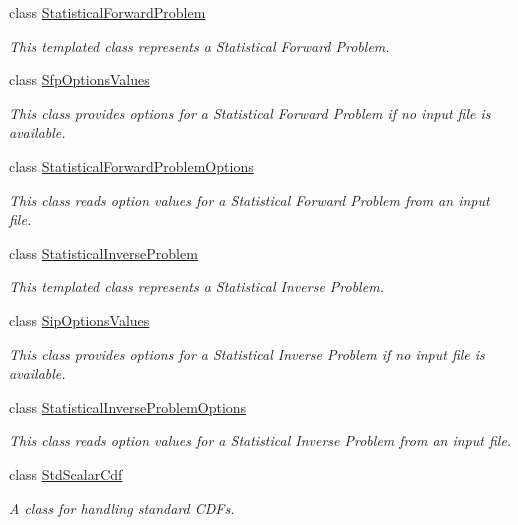 \begin{DoxyCompactItemize}
class \hyperlink{class_q_u_e_s_o_1_1_statistical_forward_problem}{Statistical\-Forward\-Problem}
\begin{DoxyCompactList}\small\item\em This templated class represents a Statistical Forward Problem. \end{DoxyCompactList}\item 
class \hyperlink{class_q_u_e_s_o_1_1_sfp_options_values}{Sfp\-Options\-Values}
\begin{DoxyCompactList}\small\item\em This class provides options for a Statistical Forward Problem if no input file is available. \end{DoxyCompactList}\item 
class \hyperlink{class_q_u_e_s_o_1_1_statistical_forward_problem_options}{Statistical\-Forward\-Problem\-Options}
\begin{DoxyCompactList}\small\item\em This class reads option values for a Statistical Forward Problem from an input file. \end{DoxyCompactList}\item 
class \hyperlink{class_q_u_e_s_o_1_1_statistical_inverse_problem}{Statistical\-Inverse\-Problem}
\begin{DoxyCompactList}\small\item\em This templated class represents a Statistical Inverse Problem. \end{DoxyCompactList}\item 
class \hyperlink{class_q_u_e_s_o_1_1_sip_options_values}{Sip\-Options\-Values}
\begin{DoxyCompactList}\small\item\em This class provides options for a Statistical Inverse Problem if no input file is available. \end{DoxyCompactList}\item 
class \hyperlink{class_q_u_e_s_o_1_1_statistical_inverse_problem_options}{Statistical\-Inverse\-Problem\-Options}
\begin{DoxyCompactList}\small\item\em This class reads option values for a Statistical Inverse Problem from an input file. \end{DoxyCompactList}\item 
class \hyperlink{class_q_u_e_s_o_1_1_std_scalar_cdf}{Std\-Scalar\-Cdf}
\begin{DoxyCompactList}\small\item\em A class for handling standard C\-D\-Fs. \end{DoxyCompactList}\item 

\end{DoxyCompactItemize}
